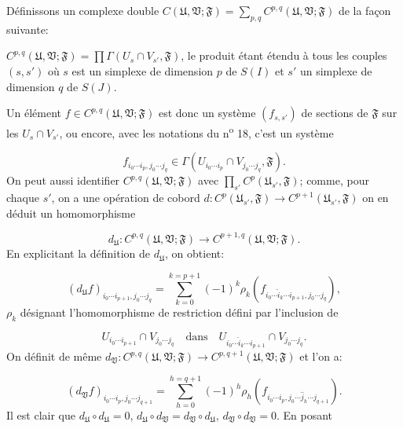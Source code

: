 Définissons un complexe double $C(\mathfrak{U}, \mathfrak{V}; \mathfrak{F}) = \sum_{p,q} C^{p,q}(\mathfrak{U}, \mathfrak{V}; \mathfrak{F})$ de la façon suivante:

$C^{p,q}(\mathfrak{U}, \mathfrak{V}; \mathfrak{F}) = \prod \Gamma (U_s \cap V_{s'}, \mathfrak{F})$, le produit étant étendu à tous les couples $(s, s')$ où $s$ est un simplexe de dimension $p$ de $S(I)$ et $s'$ un simplexe de dimension $q$ de $S(J)$.

Un élément $f \in C^{p,q}(\mathfrak{U}, \mathfrak{V}; \mathfrak{F})$ est donc un système $(f_{s,s'})$ de sections de $\mathfrak{F}$ sur les $U_s \cap V_{s'}$, ou encore, avec les notations du n\textsuperscript{o} 18, c'est un système

\begin{equation*}
f_{i_0 \cdots i_p, j_0 \cdots j_q} \in \Gamma(U_{i_0 \cdots i_p} \cap V_{j_0 \cdots j_q}, \mathfrak{F}).
\end{equation*}
On peut aussi identifier $C^{p,q}(\mathfrak{U}, \mathfrak{V}; \mathfrak{F})$ avec $\prod_{s'} C^p(\mathfrak{U}_{s'}, \mathfrak{F})$; comme, pour chaque $s'$, on a une opération de cobord $d:C^p(\mathfrak{U}_{s'}, \mathfrak{F}) \to C^{p+1}(\mathfrak{U}_{s'}, \mathfrak{F})$ on en déduit un homomorphisme

\begin{equation*}
d_{\mathfrak{U}} : C^{p,q}(\mathfrak{U}, \mathfrak{V}; \mathfrak{F}) \to C^{p+1,q}(\mathfrak{U}, \mathfrak{V}; \mathfrak{F}).
\end{equation*}
En explicitant la définition de $d_{\mathfrak{U}}$, on obtient:

\begin{equation*}
(d_{\mathfrak{U}}f)_{i_0 \cdots i_{p+1}, j_0 \cdots j_q} = \sum_{k=0}^{k=p+1} (-1)^k \rho_k(f_{i_0 \cdots \hat{i}_k \cdots i_{p+1}, j_0 \cdots j_q}),
\end{equation*}
$\rho_k$ désignant l'homomorphisme de restriction défini par l'inclusion de

\begin{equation*}
U_{i_0 \cdots i_{p+1}} \cap V_{j_0 \cdots j_q} \quad \text{dans} \quad U_{i_0 \cdots \hat{i}_k \cdots i_{p+1}} \cap V_{j_0 \cdots j_q}.
\end{equation*}
On définit de même $d_{\mathfrak{V}}:C^{p,q}(\mathfrak{U}, \mathfrak{V}; \mathfrak{F}) \to C^{p,q+1}(\mathfrak{U}, \mathfrak{V}; \mathfrak{F})$ et l'on a:

\begin{equation*}
(d_{\mathfrak{V}}f)_{i_0 \cdots i_p, j_0 \cdots j_{q+1}} = \sum_{h=0}^{h=q+1} (-1)^h \rho_h(f_{i_0 \cdots i_p, j_0 \cdots \hat{j}_h \cdots j_{q+1}}).
\end{equation*}
Il est clair que $d_{\mathfrak{U}} \circ d_{\mathfrak{U}} = 0$, $d_{\mathfrak{U}} \circ d_{\mathfrak{V}} = d_{\mathfrak{V}} \circ d_{\mathfrak{U}}$, $d_{\mathfrak{V}} \circ d_{\mathfrak{V}} = 0$. En posant


